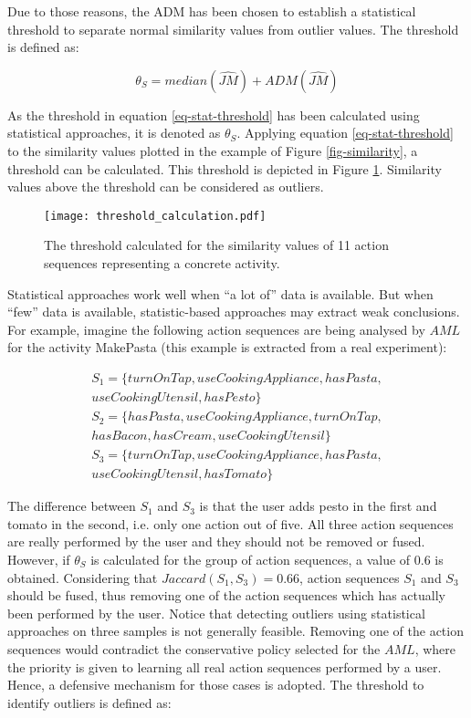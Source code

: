 Due to those reasons, the ADM has been chosen to establish a statistical threshold to separate normal similarity values from outlier values. The threshold is defined as:

\begin{equation}
\label{eq-stat-threshold}
 \theta_S = median(\hat{JM}) + ADM(\hat{JM})
\end{equation}

As the threshold in equation \ref{eq-stat-threshold} has been calculated using statistical approaches, it is denoted as $\theta_S$. Applying equation \ref{eq-stat-threshold} to the similarity values plotted in the example of Figure \ref{fig-similarity}, a threshold can be calculated. This threshold is depicted in Figure \ref{fig-threshold-calc}. Similarity values above the threshold can be considered as outliers. 

\begin{figure}[htbp]
\centering
\texttt{[image: threshold\_calculation.pdf]}
    \caption{The threshold calculated for the similarity values of 11 action sequences representing a concrete activity.}
    \label{fig-threshold-calc}
\end{figure}

Statistical approaches work well when ``a lot of'' data is available. But when ``few'' data is available, statistic-based approaches may extract weak conclusions. For example, imagine the following action sequences are being analysed by $AML$ for the activity MakePasta (this example is extracted from a real experiment):

\begin{equation*}
 \begin{split}
  S_1 = \{ turnOnTap, useCookingAppliance, hasPasta,\\ useCookingUtensil, hasPesto \} \\
  S_2 = \{ hasPasta, useCookingAppliance, turnOnTap,\\ hasBacon, hasCream, useCookingUtensil \} \\
  S_3 = \{ turnOnTap, useCookingAppliance, hasPasta,\\ useCookingUtensil, hasTomato \}
 \end{split}
\end{equation*}

The difference between $S_1$ and $S_3$ is that the user adds pesto in the first and tomato in the second, i.e. only one action out of five. All three action sequences are really performed by the user and they should not be removed or fused. However, if $\theta_S$ is calculated for the group of action sequences, a value of 0.6 is obtained. Considering that $Jaccard(S_1, S_3) = 0.66$, action sequences $S_1$ and $S_3$ should be fused, thus removing one of the action sequences which has actually been performed by the user. Notice that detecting outliers using statistical approaches on three samples is not generally feasible. Removing one of the action sequences would contradict the conservative policy selected for the $AML$, where the priority is given to learning all real action sequences performed by a user. Hence, a defensive mechanism for those cases is adopted. The threshold to identify outliers is defined as:

